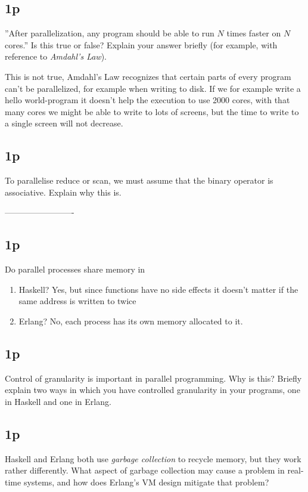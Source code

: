 \subsection{1p}
''After parallelization, any program should be able to run $N$ times faster on $N$ cores.'' Is this true or false? Explain your answer briefly (for example, with reference to \textit{Amdahl's Law}).

This is not true, Amdahl's Law recognizes that certain parts of every program can't be parallelized, for example when writing to disk. If we for example write a hello world-program it doesn't help the execution to use 2000 cores, with that many cores we might be able to write to lots of screens, but the time to write to a single screen will not decrease.

\subsection{1p}
To parallelise reduce or scan, we must assume that the binary operator is associative. Explain why this is.

-------------------------

\subsection{1p}
Do parallel processes share memory in
\begin{enumerate}[i]
	\item Haskell?
	      \subitem Yes, but since functions have no side effects it doesn't matter if the same address is written to twice
	\item Erlang?
	      \subitem  No, each process has its own memory allocated to it.
\end{enumerate}

\subsection{1p}
Control of granularity is important in parallel programming. Why is this? Briefly explain two ways in which you have controlled granularity in your programs, one in Haskell and one in Erlang.



\subsection{1p}
Haskell and Erlang both use \textit{garbage collection} to recycle memory, but they work rather differently. What aspect of garbage collection may cause a problem in real-time systems, and how does Erlang's VM design mitigate that problem?



